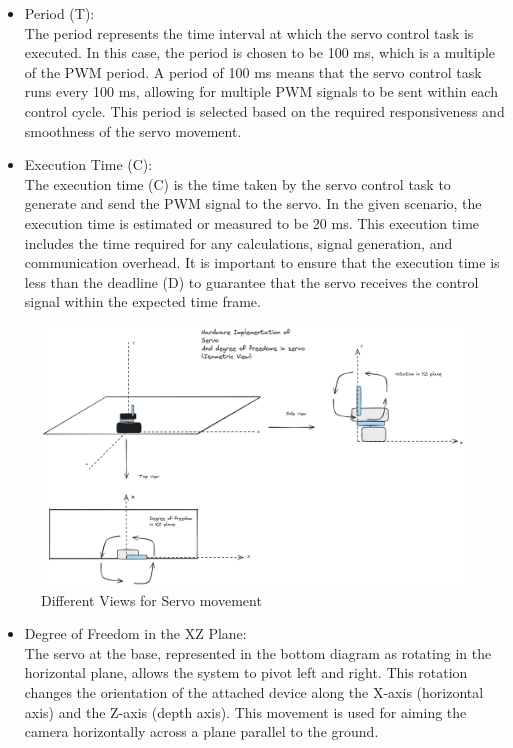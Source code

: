 \documentclass[a4paper,11pt]{article}%
\newenvironment{qanda}{\setlength{\parindent}{0pt}}{\bigskip}
\begin{document}
\begin{qanda}
\begin{enumerate}
\begin{itemize}
				\item[] Period (T):\\
					The period represents the time interval at which the servo control task is executed. In this case, the period is chosen to be 100 ms, which is a multiple of the PWM period. A period of 100 ms means that the servo control task runs every 100 ms, allowing for multiple PWM signals to be sent within each control cycle. This period is selected based on the required responsiveness and smoothness of the servo movement.
				\item[] Execution Time (C):\\
					The execution time (C) is the time taken by the servo control task to generate and send the PWM signal to the servo. In the given scenario, the execution time is estimated or measured to be 20 ms. This execution time includes the time required for any calculations, signal generation, and communication overhead. It is important to ensure that the execution time is less than the deadline (D) to guarantee that the servo receives the control signal within the expected time frame.
			\end{itemize}





			\begin{figure}[H]
				\centering
				\includegraphics[scale=0.27]{figures/isometric.png}
				\caption{Different Views for Servo movement}
			\end{figure}


			\begin{itemize}
				\item[]Degree of Freedom in the XZ Plane:\\
				The servo at the base, represented in the bottom diagram as rotating in the horizontal plane, allows the system to pivot left and right. This rotation changes the orientation of the attached device along the X-axis (horizontal axis) and the Z-axis (depth axis). This movement is used for aiming the camera horizontally across a plane parallel to the ground.


\end{itemize}
\end{enumerate}
\end{qanda}
\end{document}
